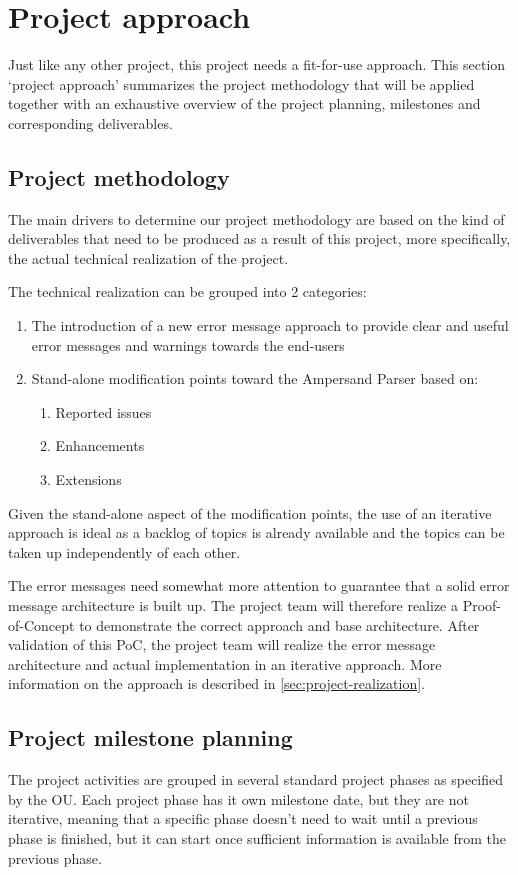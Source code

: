\section{Project approach}
\label{sec:project-approach}
Just like any other project, this project needs a fit-for-use approach. 
This section `project approach' summarizes the project methodology that will be applied together with an exhaustive overview of the project planning, milestones and corresponding deliverables.

\subsection{Project methodology}
The main drivers to determine our project methodology are based on the kind of deliverables that need to be produced as a result of this project, more specifically, the actual technical realization of the project.

The technical realization can be grouped into 2 categories:
\begin{enumerate}
	\item The introduction of a new error message approach to provide clear and useful error messages and warnings towards the end-users
	\item Stand-alone modification points toward the Ampersand Parser based on:
	\begin{enumerate}
		\item Reported issues
		\item Enhancements
		\item Extensions
	\end {enumerate}
\end {enumerate}

\noindent
Given the stand-alone aspect of the modification points, the use of an iterative approach is ideal as a backlog of topics is already available and the topics can be taken up independently of each other. 

%
The error messages need somewhat more attention to guarantee that a solid error message architecture is built up. 
The project team will therefore realize a Proof-of-Concept to demonstrate the correct approach and base architecture. 
After validation of this PoC, the project team will realize the error message architecture and actual implementation in an iterative approach.
More information on the approach is described in \autoref{sec:project-realization}.

\subsection{Project milestone planning}
\label{subsec:planning-milestones-deliverables}
The project activities are grouped in several standard project phases as specified by the OU.
Each project phase has it own milestone date, but they are not iterative, meaning that a specific phase doesn't need to wait until a previous phase is finished, but it can start once sufficient information is available from the previous phase.

